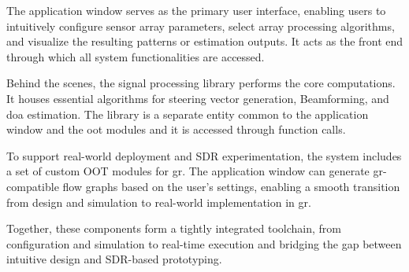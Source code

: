 The application window serves as the primary user interface, enabling users to intuitively configure sensor array parameters, select array processing algorithms, and visualize the resulting patterns or estimation outputs. It acts as the front end through which all system functionalities are accessed.

Behind the scenes, the signal processing library performs the core computations. It houses essential algorithms for steering vector generation, Beamforming, and \ac{doa} estimation. The library is a separate entity common to the application window and the \ac{oot} modules and it is accessed through function calls.

To support real-world deployment and SDR experimentation, the system includes a set of custom OOT modules for \ac{gr}. The application window can generate \ac{gr}-compatible flow graphs based on the user's settings, enabling a smooth transition from design and simulation to real-world implementation in \ac{gr}.

Together, these components form a tightly integrated toolchain, from configuration and simulation to real-time execution and bridging the gap between intuitive design and SDR-based prototyping.